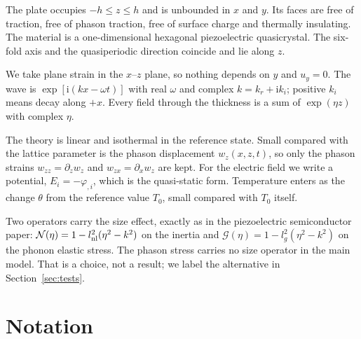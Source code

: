 \documentclass[11pt,a4paper]{article}
\newcommand{\Nc}{\mathcal{N}}
\newcommand{\Gc}{\mathcal{G}}
\newcommand{\ii}{\mathrm{i}}
\begin{document}
The plate occupies $-h\le z\le h$ and is unbounded in $x$ and $y$. Its faces are free of traction, free of
phason traction, free of surface charge and thermally insulating. The material is a one-dimensional
hexagonal piezoelectric quasicrystal. The six-fold axis and the quasiperiodic direction coincide and lie
along $z$.

We take plane strain in the $x$--$z$ plane, so nothing depends on $y$ and $u_y=0$. The wave is
$\exp[\ii(kx-\omega t)]$ with real $\omega$ and complex $k=k_r+\ii k_i$; positive $k_i$ means decay along
$+x$. Every field through the thickness is a sum of $\exp(\eta z)$ with complex $\eta$.

The theory is linear and isothermal in the reference state. Small compared with the lattice parameter is
the phason displacement $w_z(x,z,t)$, so only the phason strains $w_{zz}=\partial_zw_z$ and
$w_{zx}=\partial_xw_z$ are kept. For the electric field we write a potential, $E_i=-\varphi_{,i}$, which is
the quasi-static form. Temperature enters as the change $\theta$ from the reference value $T_0$, small
compared with $T_0$ itself.

Two operators carry the size effect, exactly as in the piezoelectric semiconductor paper:
$\Nc(\eta)=1-l_{\rm nl}^2(\eta^2-k^2)$ on the inertia and $\Gc(\eta)=1-l_g^2(\eta^2-k^2)$ on the phonon
elastic stress. The phason stress carries no size operator in the main model. That is a choice, not a
result; we label the alternative in Section~\ref{sec:tests}.

\section{Notation}\label{sec:not}
\end{document}
